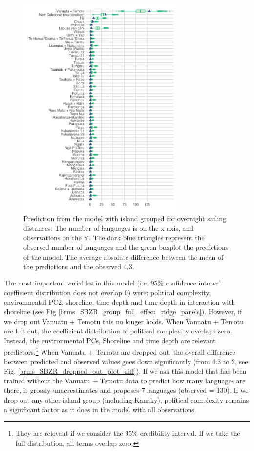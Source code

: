 \documentclass[unnumsec,webpdf,modern,medium]{oup-authoring-template}
\begin{document}
\begin{figure}[ht]
\centering
\includegraphics[width=0.75\textwidth]{latex/brms_predict_SBZR.png}
\caption{Prediction from the model with island grouped for overnight sailing distances. The number of languages is on the x-axis, and observations on the Y. The dark blue triangles represent the observed number of languages and the green boxplot the predictions of the model. The average absolute difference between the mean of the predictions and the observed  4.3.}
\label{SBZR_model_predict}
\end{figure}

The most important variables in this model (i.e. 95\% confidence interval coefficient distribution does not overlap 0) were: political complexity, environmental PC2, shoreline, time depth and time-depth in interaction with shoreline  (see Fig \ref{brms_SBZR_group_full_effect_ridge_panels}). However, if we drop out Vanuatu + Temotu this no longer holds. When Vanuatu + Temotu are left out, the coefficient distribution of political complexity overlaps zero. Instead, the environmental PCs, Shoreline and time depth are relevant predictors.\footnote{They are relevant if we consider the 95\% credibility interval. If we take the full distribution, all terms overlap zero.} When Vanuatu + Temotu are dropped out, the overall difference between predicted and observed values goes down significantly (from 4.3 to 2, see Fig. \ref{brms_SBZR_dropped_out_plot_diff}). If we ask this model that has been trained without the Vanuatu + Temotu data to predict how many languages are there, it grossly underestimates and proposes 7 languages (observed = 130). If we drop out any other island group (including Kanaky), political complexity remains a significant factor as it does in the model with all observations.
\end{document}

